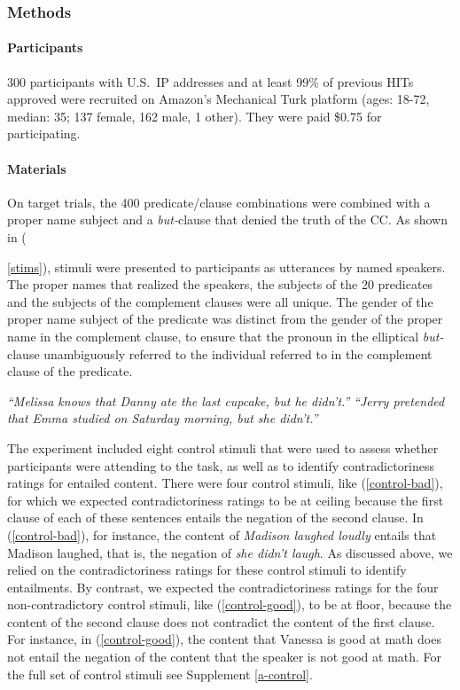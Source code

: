 \documentclass[11pt,fleqn]{article}
\newcommand{\6}{\mbox{$[\hspace*{-.6mm}[$}}
\newcommand{\9}{\mbox{$]\hspace*{-.6mm}]$}}
\begin{document}
\subsubsection{Methods}

\paragraph{Participants} 300 participants with U.S.\ IP addresses and at least 99\% of previous HITs approved were recruited on Amazon's Mechanical Turk platform (ages: 18-72, median: 35; 137 female, 162 male, 1 other). They were paid \$0.75 for participating.

\paragraph{Materials} On target trials, the 400 predicate/clause combinations were combined with a proper name subject and a {\em but-}clause that denied the truth of the CC. As shown in ({\ref{stims}), stimuli were presented to participants as utterances by named speakers. The proper names that realized the speakers, the subjects of the 20 predicates and the subjects of the complement clauses were all unique. The gender of the proper name subject of the predicate was distinct from the gender of the proper name in the complement clause, to ensure that the pronoun in the elliptical {\em but-}clause unambiguously referred to the individual referred to in the complement clause of the predicate.

\begin{exe}
\ex\label{stims}
\begin{xlist}
 {\em ``Melissa knows that Danny ate the last cupcake, but he didn't.''}
 {\em ``Jerry pretended that Emma studied on Saturday morning, but she didn't.''}
\end{xlist}
\end{exe}

The experiment  included eight control stimuli that were used to assess whether participants were attending to the task, as well as to identify contradictoriness ratings for entailed content. There were four control stimuli, like (\ref{control-bad}), for which we expected contradictoriness ratings to be at ceiling because the first clause of each of these sentences entails the negation of the second clause. In (\ref{control-bad}), for instance, the content of {\em Madison laughed loudly} entails that Madison laughed, that is, the negation of {\em she didn't laugh}. As discussed above, we relied on the contradictoriness ratings for these control stimuli to identify entailments. By contrast, we expected the contradictoriness ratings for the four non-contradictory control stimuli, like (\ref{control-good}), to be at floor, because the content of the second clause does not contradict the content of the first clause. For instance, in (\ref{control-good}), the content that Vanessa is good at math does not entail the negation of the content that the speaker is not good at math. For the full set of control stimuli see Supplement \ref{a-control}.

}
\end{document}
